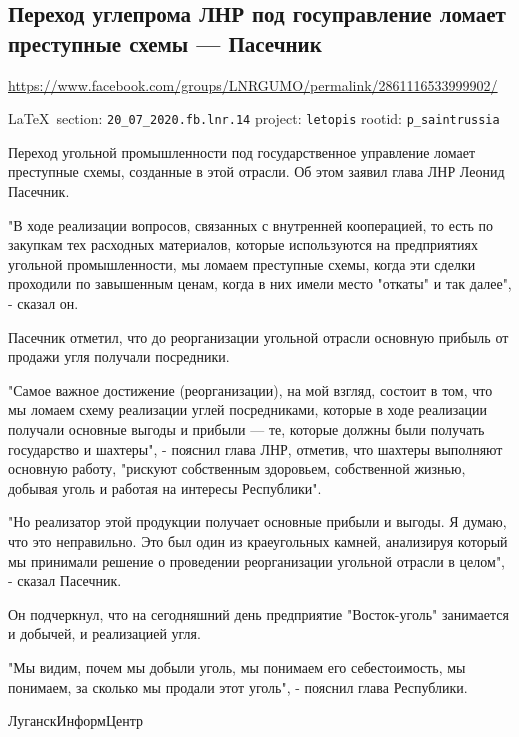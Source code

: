  
 
  
  
\subsection{Переход углепрома ЛНР под госуправление ломает преступные схемы --- Пасечник}
\label{sec:20_07_2020.fb.lnr.14}
\url{https://www.facebook.com/groups/LNRGUMO/permalink/2861116533999902/}

\vspace{0.5cm}
{\small\LaTeX~section: \verb|20_07_2020.fb.lnr.14| project: \verb|letopis| rootid: \verb|p_saintrussia|}
\vspace{0.5cm}

Переход угольной промышленности под государственное управление ломает
преступные схемы, созданные в этой отрасли. Об этом заявил глава ЛНР Леонид
Пасечник.

"В ходе реализации вопросов, связанных с внутренней кооперацией, то есть по
закупкам тех расходных материалов, которые используются на предприятиях
угольной промышленности, мы ломаем преступные схемы, когда эти сделки проходили
по завышенным ценам, когда в них имели место "откаты" и так далее", - сказал
он.

Пасечник отметил, что до реорганизации угольной отрасли основную прибыль от
продажи угля получали посредники.

"Самое важное достижение (реорганизации), на мой взгляд, состоит в том, что мы
ломаем схему реализации углей посредниками, которые в ходе реализации получали
основные выгоды и прибыли --- те, которые должны были получать государство и
шахтеры", - пояснил глава ЛНР, отметив, что шахтеры выполняют основную работу,
"рискуют собственным здоровьем, собственной жизнью, добывая уголь и работая на
интересы Республики".

"Но реализатор этой продукции получает основные прибыли и выгоды. Я думаю, что
это неправильно. Это был один из краеугольных камней, анализируя который мы
принимали решение о проведении реорганизации угольной отрасли в целом", -
сказал Пасечник.

Он подчеркнул, что на сегодняшний день предприятие "Восток-уголь" занимается и
добычей, и реализацией угля.

"Мы видим, почем мы добыли уголь, мы понимаем его себестоимость, мы понимаем,
за сколько мы продали этот уголь", - пояснил глава Республики.

ЛуганскИнформЦентр
